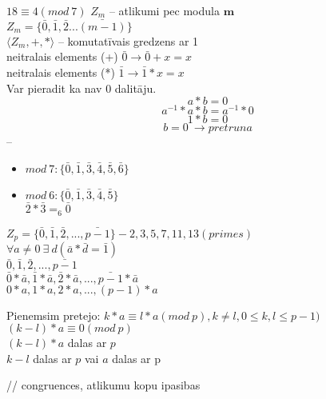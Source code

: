   $18 \equiv 4 (mod \ 7)$
\newline
  $Z_m$ -- atlikumi pec modula $\boldsymbol{m}$ \\
  $Z_m = \{ \bar{0}, \bar{1}, \bar{2} ...\bar{(m-1)}\}$ \\


  $\langle Z_m, +, * \rangle$ -- komutatīvais gredzens ar 1\\
  neitralais elements (+)  $\bar{0} \rightarrow\bar{0} + x = x$ \\
  neitralais elements (*)  $\bar{1} \rightarrow\bar{1} * x = x$ \\

Var pieradit ka nav 0 dalitāju.
$$a * b = 0$$
$$a^{-1}* a * b = a^{-1}*0$$
$$ 1*b = 0$$
$$ b = 0  \  \rightarrow pretruna$$ -- 


\begin{itemize}
  \item $mod \ 7: \{ \bar{0}, \bar{1}, \bar{3}, \bar{4}, \bar{5}, \bar{6}\}$
  \item $mod \ 6: \{ \bar{0}, \bar{1}, \bar{3}, \bar{4}, \bar{5} \}$ \\
  $\bar{2} * \bar{3} =_6 \bar{0} $ 
\end{itemize}
$Z_p = \{ \bar{0}, \bar{1}, \bar{2}, ..., \bar{p-1} \} - 2, 3, 5, 7, 11, 13 (primes) $ \\
$\forall a \ne 0 \ \exists \ d(\bar{a} * \bar{d} = \bar{1})$ \\
$\bar{0}, \bar{1}, \bar{2}, ..., \bar{p-1}$ \\
$\bar{0} * \bar{a}, \bar{1} * \bar{a}, \bar{2} * \bar{a}, ..., \bar{p-1} * \bar{a}$ \\
$0*a, 1*a, 2*a, ..., (p-1)*a$

Pienemsim pretejo: $k*a \equiv l * a (mod \ p), k \ne l , 0 \le k, l \le p-1 )$ \\
$(k -l)*a \equiv 0 (mod \ p)$ \\
$(k - l) * a$ dalas ar $p$ \\
$k -l $  dalas ar $p$ vai $a$ dalas ar p 

//  congruences, atlikumu kopu ipasibas





